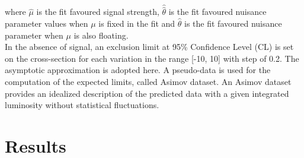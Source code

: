 where $\hat{\mu}$ is the fit favoured signal strength, $\hat{\hat{\theta}}$ is the fit favoured nuisance parameter values when $\mu$ is fixed in the fit and $\hat{\theta}$ is the fit favoured nuisance parameter when $\mu$ is also floating. \\
In the absence of signal, an exclusion limit at 95\% Confidence Level (CL) is set on the \HHyybb cross-section for each \kl variation in the range [-10, 10] with step of 0.2. The asymptotic approximation \cite{Z} is adopted here. A pseudo-data is used for the computation of the expected limits, called Asimov dataset. An Asimov dataset provides an idealized description of the predicted data with a given integrated luminosity without statistical fluctuations.

\section{Results}
\label{HHyybb:Results}

